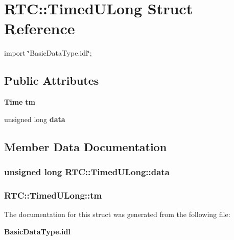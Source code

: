 \section{RTC::TimedULong Struct Reference}
\label{structRTC_1_1TimedULong}


{\ttfamily import \char`\"{}BasicDataType.idl\char`\"{};}

\subsection*{Public Attributes}
\begin{DoxyCompactItemize}
\item 
{\bf Time} {\bf tm}
\item 
unsigned long {\bf data}
\end{DoxyCompactItemize}


\subsection{Member Data Documentation}
\subsubsection[{data}]{\setlength{\rightskip}{0pt plus 5cm}unsigned long {\bf RTC::TimedULong::data}}\label{structRTC_1_1TimedULong_a393f0d18a0039b4a405701d655fec589}
\subsubsection[{tm}]{ {\bf RTC::TimedULong::tm}}\label{structRTC_1_1TimedULong_a187dabc5fbdac2b5c167cecfba5b499e}


The documentation for this struct was generated from the following file:\begin{DoxyCompactItemize}
\item 
{\bf BasicDataType.idl}\end{DoxyCompactItemize}
